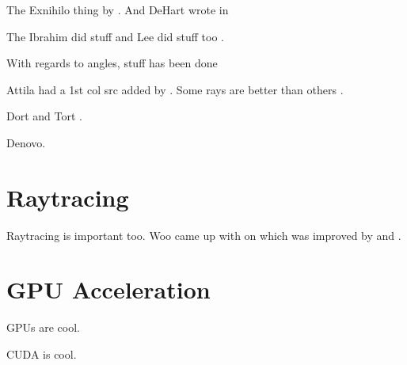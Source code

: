 The Exnihilo thing by \citet{ref:evanst}. And DeHart wrote in \citep{ref:dehartm}

The Ibrahim did stuff \citep{ref:ibrahima} and Lee did stuff too \citep{ref:leeb}.

With regards to angles, stuff has been done \citep{ref:ahrensc}

Attila had a 1st col src added by \citep{ref:wareingt}. Some rays are better than others \citep{ref:mathewsk}.

Dort and Tort \citep{ref:rhoadesw}.

Denovo.

\section{Raytracing}

Raytracing is important too. Woo came up with on \citep{ref:wooa} which was improved by \citet{ref:liuy} and \citet{ref:hel}.

\section{GPU Acceleration}
GPUs are cool.

CUDA is cool.


\endinput
